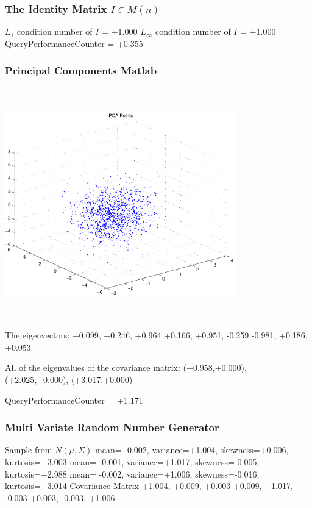 \documentclass[9pt]{article}
\theoremstyle{plain}
\theoremstyle{definition}
\theoremstyle{remark}
\numberwithin{equation}{section}
\begin{document}
\subsubsection{The Identity Matrix $I \in M(n)$}
$L_1$ condition number of $I$ = +1.000
$L_\infty$ condition number of $I$ = +1.000
QueryPerformanceCounter  =  +0.355
\subsubsection{Principal Components Matlab }
\includegraphics[width=10.0cm,height=10.0cm]{PCAPoints.pdf}

The eigenvectors:
+0.099, +0.246, +0.964
+0.166, +0.951, -0.259
-0.981, +0.186, +0.053

All of the eigenvalues of the covariance matrix:
(+0.958,+0.000), (+2.025,+0.000), (+3.017,+0.000)

QueryPerformanceCounter  =  +1.171
\subsubsection{Multi Variate Random Number Generator }
Sample from $N(\mu,\Sigma)$
mean= -0.002, variance=+1.004, skewness=+0.006, kurtosis=+3.003
mean= -0.001, variance=+1.017, skewness=-0.005, kurtosis=+2.988
mean= -0.002, variance=+1.006, skewness=-0.016, kurtosis=+3.014
Covariance Matrix 
+1.004, +0.009, +0.003
+0.009, +1.017, -0.003
+0.003, -0.003, +1.006
\end{document}
